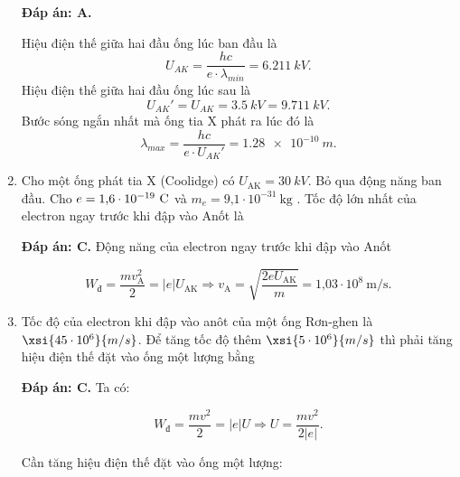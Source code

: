 \begin{enumerate}[label=\bfseries Câu \arabic*:]
	\loigiai
	{		\textbf{Đáp án: A.}
		
		Hiệu điện thế giữa hai đầu ống lúc ban đầu là
		$$
		U_{AK} = \dfrac{hc}{e\cdot \lambda_{min}} = \SI{6,211}{kV}.
		$$
		Hiệu điện thế giữa hai đầu ống lúc sau là
		$$
		U_{AK}' = U_{AK} = \SI{3,5}{kV} = \SI{9,711}{kV}.
		$$
		Bước sóng ngắn nhất mà ống tia X phát ra lúc đó là
		$$
		\lambda_{max} = \dfrac{hc}{e \cdot U_{AK}'} = \SI{1,28e-10}{m}.
		$$
	}
		\item {} 
	\cauhoi
	{Cho một ống phát tia X (Coolidge) có  $U_\text{AK}= \SI{30}{kV}$. Bỏ qua động năng ban đầu. Cho $e = \text{1,6}\cdot 10^{-19}\ \text C$ và $m_e = \text{9,1}\cdot 10^{-31}\ \text{kg}$ . Tốc độ lớn nhất của electron ngay trước khi đập vào Anốt là
		
	}
	
	\loigiai
	{		\textbf{Đáp án: C.}
		Động năng của electron ngay trước khi đập vào Anốt
		
		$$W_\text{đ} = \dfrac{mv^2_\text{A}}{2} = |e|U_\text{AK} \Rightarrow v_\text{A} = \sqrt{\dfrac{2eU_\text{AK}}{m}} = \text{1,03} \cdot 10^8\ \text{m/s}.$$
	}
		\item {} 
	\cauhoi
	{Tốc độ của electron khi đập vào anôt của một ống Rơn-ghen là  $\xsi{45\cdot 10^6}{m/s}$. Để tăng tốc độ thêm  $\xsi{5\cdot 10^6}{m/s}$ thì phải tăng hiệu điện thế đặt vào ống một lượng bằng
		
	}
	
	\loigiai
	{		\textbf{Đáp án: C.}
		Ta có: 
		
		$$W_\text{đ} = \dfrac{mv^2}{2} =|e|U \Rightarrow U = \dfrac{mv^2}{2|e|}.$$
		
		Cần tăng hiệu điện thế đặt vào ống một lượng:
		
}
\end{enumerate}
